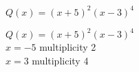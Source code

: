 {$Q(x) = (x + 5)^{2}(x - 3)^{4}$
}
{$Q(x) = (x + 5)^{2}(x - 3)^{4}$\\
$x = -5$ multiplicity 2\\
$x = 3$ multiplicity 4

\begin{center}
\end{center}}